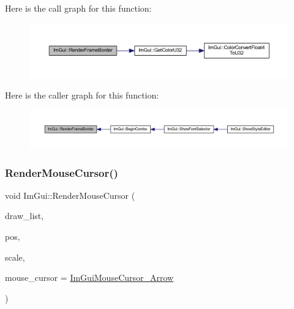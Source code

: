 Here is the call graph for this function\+:
\nopagebreak
\begin{figure}[H]
\begin{center}
\leavevmode
\includegraphics[width=350pt]{namespace_im_gui_adc76239c2006e66f8dab7638529a763d_cgraph}
\end{center}
\end{figure}
Here is the caller graph for this function\+:
\nopagebreak
\begin{figure}[H]
\begin{center}
\leavevmode
\includegraphics[width=350pt]{namespace_im_gui_adc76239c2006e66f8dab7638529a763d_icgraph}
\end{center}
\end{figure}
\mbox{\label{namespace_im_gui_a01dc52b1969c6b3ae52fdd3228b377ad}} 
\subsubsection{\texorpdfstring{Render\+Mouse\+Cursor()}{RenderMouseCursor()}}
{\footnotesize\ttfamily void Im\+Gui\+::\+Render\+Mouse\+Cursor (\begin{DoxyParamCaption}\item[{\mbox{\hyperlink{struct_im_draw_list}{Im\+Draw\+List}} $\ast$}]{draw\+\_\+list,  }\item[{\mbox{\hyperlink{struct_im_vec2}{Im\+Vec2}}}]{pos,  }\item[{float}]{scale,  }\item[{\mbox{\hyperlink{imgui_8h_a9223d6c82bb5d12c2eab5f829ca520ef}{Im\+Gui\+Mouse\+Cursor}}}]{mouse\+\_\+cursor = {\ttfamily \mbox{\hyperlink{imgui_8h_a2eb1181cc1d7872a061df8731141dde9ad0616df87319845990941ce7c9deb197}{Im\+Gui\+Mouse\+Cursor\+\_\+\+Arrow}}} }\end{DoxyParamCaption})}

